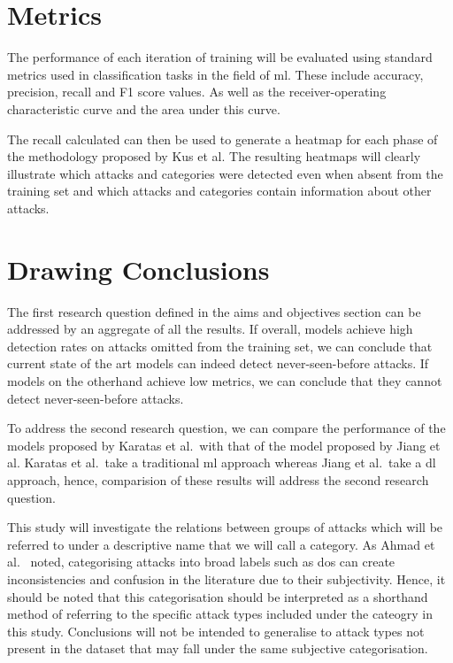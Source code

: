 \section{Metrics}%
\label{sec:metrics}

The performance of each iteration of training will be evaluated using standard
metrics used in classification tasks in the field of \gls{ml}. These include
accuracy, precision, recall and F1 score values. As well as the
receiver-operating characteristic curve and the area under this curve.

The recall calculated can then be used to generate a heatmap for each phase of
the methodology proposed by Kus et al. The resulting heatmaps will clearly
illustrate which attacks and categories were detected even when absent from the
training set and which attacks and categories contain information about other
attacks.

\section{Drawing Conclusions}%
\label{sec:conclusions}

The first research question defined in the aims and objectives section can be
addressed by an aggregate of all the results. If overall, models achieve high
detection rates on attacks omitted from the training set, we can conclude that
current state of the art models can indeed detect never-seen-before attacks. If
models on the otherhand achieve low metrics, we can conclude that they cannot
detect never-seen-before attacks.

To address the second research question, we can compare the performance of the
models proposed by Karatas et al.\ with that of the model proposed by Jiang et
al. Karatas et al.\ take a traditional \gls{ml} approach whereas Jiang et al.\
take a \gls{dl} approach, hence, comparision of these results will address the
second research question.

This study will investigate the relations between groups of attacks which will
be referred to under a descriptive name that we will call a category. As Ahmad
et al.~\cite{zero-day} noted, categorising attacks into broad labels such as
\gls{dos} can create inconsistencies and confusion in the literature due to
their subjectivity. Hence, it should be noted that this categorisation should
be interpreted as a shorthand method of referring to the specific attack types
included under the cateogry in this study. Conclusions will not be intended to
generalise to attack types not present in the dataset that may fall under the
same subjective categorisation.
